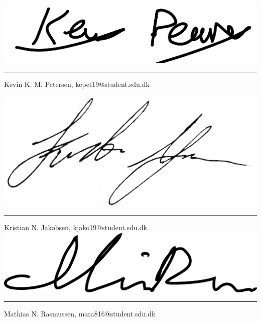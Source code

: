 \vspace{-6.5mm}
\noindent
\includegraphics[scale=0.3]{figures/signatures/signature_kepet19.png}
\vspace{-8mm}
\par\noindent\rule{\textwidth}{0.4pt}
\noindent
Kevin K. M. Petersen, kepet19@student.sdu.dk

\noindent
\includegraphics[scale=0.04]{figures/signatures/signature_kjako19.jpg}
\vspace{-9.5mm}
\par\noindent\rule{\textwidth}{0.4pt}
\noindent
Kristian N. Jakobsen, kjako19@student.sdu.dk\\

\noindent
\includegraphics[scale=0.120]{figures/signatures/Signatur_mara816.png}
\vspace{-5mm}
\par\noindent\rule{\textwidth}{0.4pt}
\noindent
Mathias N. Rasmussen, mara816@student.sdu.dk\\

